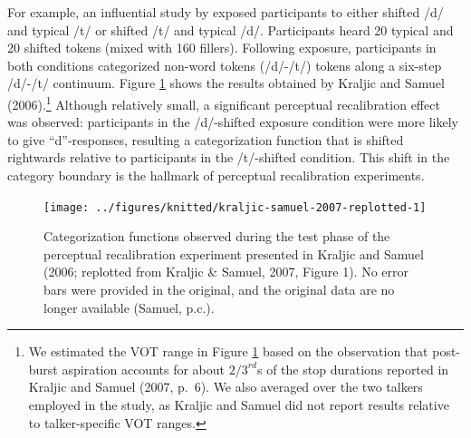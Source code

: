 \documentclass[
  11pt,
  man,floatsintext]{apa6}
\begin{document}
For example, an influential study by \textcite{kraljic-samuel2006} exposed participants to either shifted /d/ and typical /t/ or shifted /t/ and typical /d/. Participants heard 20 typical and 20 shifted tokens (mixed with 160 fillers). Following exposure, participants in both conditions categorized non-word tokens (/d/-/t/) tokens along a six-step /d/-/t/ continuum. Figure \ref{fig:kraljic-samuel-2007-replotted} shows the results obtained by Kraljic and Samuel (2006).\footnote{We estimated the VOT range in Figure \ref{fig:kraljic-samuel-2007-replotted} based on the observation that post-burst aspiration accounts for about \(2/3^{rd}\)s of the stop durations reported in Kraljic and Samuel (2007, p.~6). We also averaged over the two talkers employed in the study, as Kraljic and Samuel did not report results relative to talker-specific VOT ranges.} Although relatively small, a significant perceptual recalibration effect was observed: participants in the /d/-shifted exposure condition were more likely to give ``d''-responses, resulting a categorization function that is shifted rightwards relative to participants in the /t/-shifted condition. This shift in the category boundary is the hallmark of perceptual recalibration experiments.



\begin{figure}

{\centering \texttt{[image: ../figures/knitted/kraljic-samuel-2007-replotted-1]} 

}

\caption{Categorization functions observed during the test phase of the perceptual recalibration experiment presented in Kraljic and Samuel (2006; replotted from Kraljic \& Samuel, 2007, Figure 1). No error bars were provided in the original, and the original data are no longer available (Samuel, p.c.).}\label{fig:kraljic-samuel-2007-replotted}
\end{figure}
\end{document}
